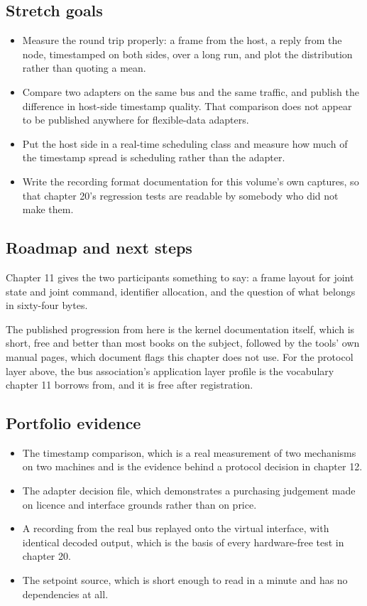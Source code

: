 \subsection*{Stretch goals}

\begin{itemize}
\item Measure the round trip properly: a frame from the host, a reply from the
node, timestamped on both sides, over a long run, and plot the distribution
rather than quoting a mean.
\item Compare two adapters on the same bus and the same traffic, and publish the
difference in host-side timestamp quality. That comparison does not appear to be
published anywhere for flexible-data adapters.
\item Put the host side in a real-time scheduling class and measure how much of
the timestamp spread is scheduling rather than the adapter.
\item Write the recording format documentation for this volume's own captures,
so that chapter 20's regression tests are readable by somebody who did not make
them.
\end{itemize}

\subsection*{Roadmap and next steps}

Chapter 11 gives the two participants something to say: a frame layout for joint
state and joint command, identifier allocation, and the question of what belongs
in sixty-four bytes.

The published progression from here is the kernel documentation itself, which is
short, free and better than most books on the subject, followed by the tools'
own manual pages, which document flags this chapter does not use. For the
protocol layer above, the bus association's application layer profile is the
vocabulary chapter 11 borrows from, and it is free after registration.

\subsection*{Portfolio evidence}

\begin{itemize}
\item The timestamp comparison, which is a real measurement of two mechanisms on
two machines and is the evidence behind a protocol decision in chapter 12.
\item The adapter decision file, which demonstrates a purchasing judgement made
on licence and interface grounds rather than on price.
\item A recording from the real bus replayed onto the virtual interface, with
identical decoded output, which is the basis of every hardware-free test in
chapter 20.
\item The setpoint source, which is short enough to read in a minute and has no
dependencies at all.
\end{itemize}

